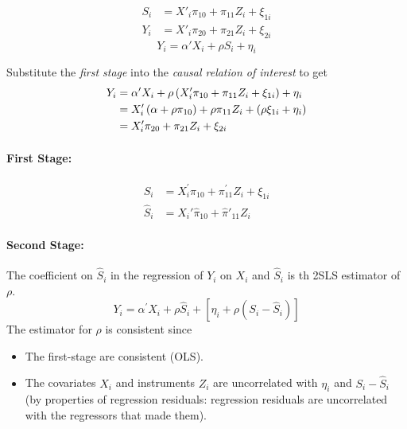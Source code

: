 \documentclass[11pt]{article}
\begin{document}
\begin{align*}
	S_i &= X'_i \pi_{10} + \pi_{11}Z_i + \xi_{1i} \tag{First-Stage}\\
	Y_i &= X'_i \pi_{20} + \pi_{21}Z_i + \xi_{2i} \tag{Reduced Form}
\end{align*}
\begin{equation}
	Y_i = \alpha'X_i + \rho S_i + \eta_i \tag{Causal Relation of Interest (ILS)}
\end{equation}

Substitute the \emph{first stage} into the \emph{causal relation of interest} to get
\begin{align*}
	Y_i &= \alpha'X_i + \rho \left( X'_i \pi_{10} + \pi_{11}Z_i + \xi_{1i} \right) + \eta_i \\
	&= X'_i\left( \alpha + \rho \pi_{10} \right) + \rho \pi_{11} Z_i + \left( \rho \xi_{1i} + \eta_i \right) \\
	&= X'_i \pi_{20} + \pi_{21} Z_i + \xi_{2i}
\end{align*}

\paragraph*{First Stage:}
\begin{align*}
	S_{i} &=X_{i}^{\prime} \pi_{10}+\pi_{11}^{\prime} Z_{i}+\xi_{1 i}  \\
	\hat{S}_i &= X_i' \hat{\pi}_{10} + \hat{\pi}'_{11} Z_i \tag{OLS fitted values}
\end{align*}

\paragraph*{Second Stage:}
The coefficient on $\hat{S}_i$ in the regression of $Y_i$ on $X_i$ and $\hat{S}_i$ is th 2SLS estimator of $\rho$. 
\begin{equation}
	Y_{i} =\alpha^{\prime} X_{i}+\rho \hat{S}_{i}+\left[\eta_{i}+\rho\left(S_{i}-\hat{S}_{i}\right)\right] 
\end{equation}
The estimator for $\rho$ is consistent since
\begin{itemize}
	\item The first-stage are consistent (OLS).
	\item The covariates $X_i$ and instruments $Z_i$ are uncorrelated with $\eta_i$ and $S_i - \hat{S}_i$ (by properties of regression residuals: regression residuals are uncorrelated with the regressors that made them). 
\end{itemize}
\end{document}
